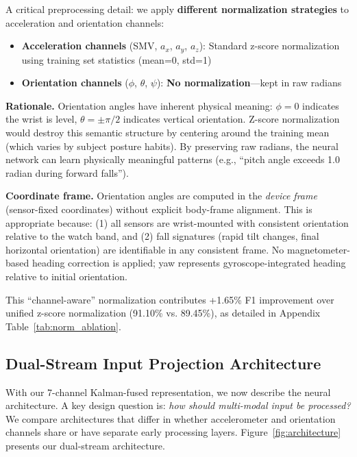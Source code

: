 A critical preprocessing detail: we apply \textbf{different normalization strategies} to acceleration and orientation channels:

\begin{itemize}
    \item \textbf{Acceleration channels} (SMV, $a_x$, $a_y$, $a_z$): Standard z-score normalization using training set statistics (mean=0, std=1)
    \item \textbf{Orientation channels} ($\phi$, $\theta$, $\psi$): \textbf{No normalization}---kept in raw radians
\end{itemize}

\textbf{Rationale.} Orientation angles have inherent physical meaning: $\phi = 0$ indicates the wrist is level, $\theta = \pm\pi/2$ indicates vertical orientation. Z-score normalization would destroy this semantic structure by centering around the training mean (which varies by subject posture habits). By preserving raw radians, the neural network can learn physically meaningful patterns (e.g., ``pitch angle exceeds 1.0 radian during forward falls'').

\textbf{Coordinate frame.} Orientation angles are computed in the \textit{device frame} (sensor-fixed coordinates) without explicit body-frame alignment. This is appropriate because: (1) all sensors are wrist-mounted with consistent orientation relative to the watch band, and (2) fall signatures (rapid tilt changes, final horizontal orientation) are identifiable in any consistent frame. No magnetometer-based heading correction is applied; yaw represents gyroscope-integrated heading relative to initial orientation.

This ``channel-aware'' normalization contributes +1.65\% F1 improvement over unified z-score normalization (91.10\% vs. 89.45\%), as detailed in Appendix Table~\ref{tab:norm_ablation}.

\subsection{Dual-Stream Input Projection Architecture}
\label{subsec:architecture}

With our 7-channel Kalman-fused representation, we now describe the neural architecture. A key design question is: \textit{how should multi-modal input be processed?} We compare architectures that differ in whether accelerometer and orientation channels share or have separate early processing layers. Figure~\ref{fig:architecture} presents our dual-stream architecture.

